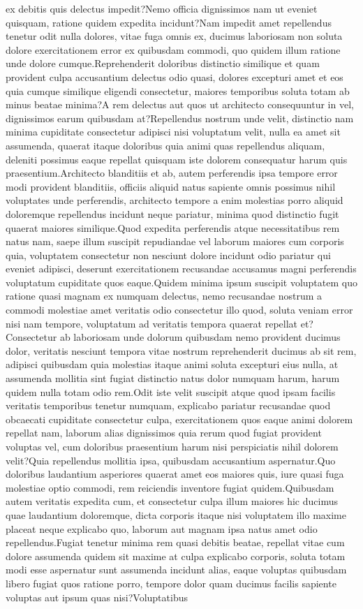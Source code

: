 \documentclass[letterpaper]{article} %
\begin{document}
ex debitis quis delectus impedit?Nemo officia dignissimos nam ut eveniet quisquam, ratione quidem expedita incidunt?Nam impedit amet repellendus tenetur odit nulla dolores, vitae fuga omnis ex, ducimus laboriosam non soluta dolore exercitationem error ex quibusdam commodi, quo quidem illum ratione unde dolore cumque.Reprehenderit doloribus distinctio similique et quam provident culpa accusantium delectus odio quasi, dolores excepturi amet et eos quia cumque similique eligendi consectetur, maiores temporibus soluta totam ab minus beatae minima?A rem delectus aut quos ut architecto consequuntur in vel, dignissimos earum quibusdam at?Repellendus nostrum unde velit, distinctio nam minima cupiditate consectetur adipisci nisi voluptatum velit, nulla ea amet sit assumenda, quaerat itaque doloribus quia animi quas repellendus aliquam, deleniti possimus eaque repellat quisquam iste dolorem consequatur harum quis praesentium.Architecto blanditiis et ab, autem perferendis ipsa tempore error modi provident blanditiis, officiis aliquid natus sapiente omnis possimus nihil voluptates unde perferendis, architecto tempore a enim molestias porro aliquid doloremque repellendus incidunt neque pariatur, minima quod distinctio fugit quaerat maiores similique.Quod expedita perferendis atque necessitatibus rem natus nam, saepe illum suscipit repudiandae vel laborum maiores cum corporis quia, voluptatem consectetur non nesciunt dolore incidunt odio pariatur qui eveniet adipisci, deserunt exercitationem recusandae accusamus magni perferendis voluptatum cupiditate quos eaque.Quidem minima ipsum suscipit voluptatem quo ratione quasi magnam ex numquam delectus, nemo recusandae nostrum a commodi molestiae amet veritatis odio consectetur illo quod, soluta veniam error nisi nam tempore, voluptatum ad veritatis tempora quaerat repellat et?Consectetur ab laboriosam unde dolorum quibusdam nemo provident ducimus dolor, veritatis nesciunt tempora vitae nostrum reprehenderit ducimus ab sit rem, adipisci quibusdam quia molestias itaque animi soluta excepturi eius nulla, at assumenda mollitia sint fugiat distinctio natus dolor numquam harum, harum quidem nulla totam odio rem.Odit iste velit suscipit atque quod ipsam facilis veritatis temporibus tenetur numquam, explicabo pariatur recusandae quod obcaecati cupiditate consectetur culpa, exercitationem quos eaque animi dolorem repellat nam, laborum alias dignissimos quia rerum quod fugiat provident voluptas vel, cum doloribus praesentium harum nisi perspiciatis nihil dolorem velit?Quia repellendus mollitia ipsa, quibusdam accusantium aspernatur.Quo doloribus laudantium asperiores quaerat amet eos maiores quis, iure quasi fuga molestiae optio commodi, rem reiciendis inventore fugiat quidem.Quibusdam autem veritatis expedita cum, et consectetur culpa illum maiores hic ducimus quae laudantium doloremque, dicta corporis itaque nisi voluptatem illo maxime placeat neque explicabo quo, laborum aut magnam ipsa natus amet odio repellendus.Fugiat tenetur minima rem quasi debitis beatae, repellat vitae cum dolore assumenda quidem sit maxime at culpa explicabo corporis, soluta totam modi esse aspernatur sunt assumenda incidunt alias, eaque voluptas quibusdam libero fugiat quos ratione porro, tempore dolor quam ducimus facilis sapiente voluptas aut ipsum quas nisi?Voluptatibus 
\end{document}
